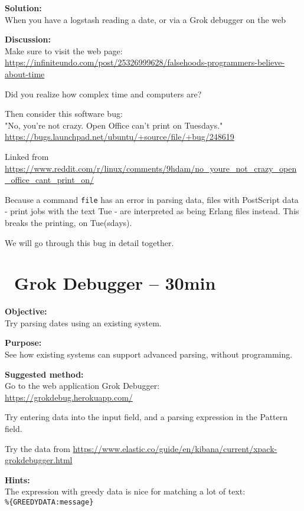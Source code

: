 \documentclass[a4paper,11pt,notitlepage]{report}
\begin{document}
{\bf Solution:}\\
When you have a logstash reading a date, or via a Grok debugger on the web

{\bf Discussion:}\\
Make sure to visit the web page:\\
\url{https://infiniteundo.com/post/25326999628/falsehoods-programmers-believe-about-time}

Did you realize how complex time and computers are?

Then consider this software bug:\\
"No, you're not crazy. Open Office can't print on Tuesdays."\\
\url{https://bugs.launchpad.net/ubuntu/+source/file/+bug/248619}

Linked from\\
{\footnotesize\url{https://www.reddit.com/r/linux/comments/9hdam/no_youre_not_crazy_open_office_cant_print_on/}}

Because a command \verb+file+ has an error in parsing data, files with PostScript data - print jobs with the text Tue - are interpreted as being Erlang files instead. This breaks the printing, on Tue(sdays).

We will go through this bug in detail together.


\chapter{\faInfoCircle\ Grok Debugger -- 30min}
\label{ex:grokdebugger1}


{\bf Objective:}\\
Try parsing dates using an existing system.

{\bf Purpose:}\\
See how existing systems can support advanced parsing, without programming.

{\bf Suggested method:}\\
Go to the web application Grok Debugger:\\
\url{https://grokdebug.herokuapp.com/}

Try entering data into the input field, and a parsing expression in the Pattern field.

Try the data from
\url{https://www.elastic.co/guide/en/kibana/current/xpack-grokdebugger.html}



{\bf Hints:}\\
The expression with greedy data is nice for matching a lot of text:\\
\verb+%{GREEDYDATA:message}+
\end{document}
